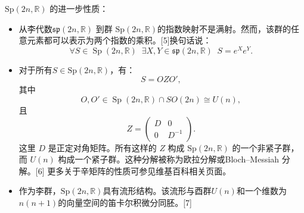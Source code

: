 $\mathrm{Sp}(2n, \mathbb{R})$ 的进一步性质：
\begin{itemize}
\item 从李代数$\mathfrak{sp}(2n, \mathbb{R})$ 到群 $\mathrm{Sp}(2n, \mathbb{R})$的指数映射不是满射。然而，该群的任意元素都可以表示为两个指数的乘积。[5]换句话说：
   $$
   \forall S \in \operatorname{Sp}(2n,\mathbb{R}) \;\; \exists X, Y \in \mathfrak{sp}(2n,\mathbb{R}) \;\; S = e^{X} e^{Y}.~
   $$
\item 对于所有$S \in \mathrm{Sp}(2n, \mathbb{R})$，有：
   $$
   S = O Z O',~
   $$
   其中
   $$
   O, O' \in \operatorname{Sp}(2n, \mathbb{R}) \cap SO(2n) \cong U(n),~
   $$
   且
   $$
   Z = \begin{pmatrix} D & 0 \\ 0 & D^{-1} \end{pmatrix}.~
   $$
   这里 $D$ 是正定对角矩阵。所有这样的 $Z$ 构成 $\mathrm{Sp}(2n, \mathbb{R})$ 的一个非紧子群，而 $U(n)$ 构成一个紧子群。这种分解被称为欧拉分解或Bloch–Messiah 分解。[6] 更多关于辛矩阵的性质可参见维基百科相关页面。
\item 作为李群，$\mathrm{Sp}(2n, \mathbb{R})$具有流形结构。该流形与酉群$U(n)$和一个维数为$n(n+1)$的向量空间的笛卡尔积微分同胚。[7]
\end{itemize}
